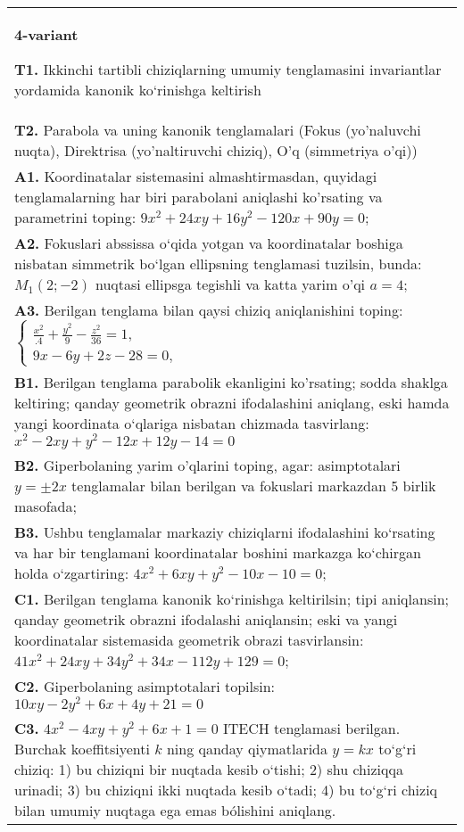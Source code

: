 \documentclass{article}
\begin{document}
\begin{tabular}{m{17cm}}
\textbf{4-variant}
\newline

\textbf{T1.} Ikkinchi tartibli chiziqlarning umumiy tenglamasini invariantlar yordamida kanonik ko‘rinishga keltirish \\
\textbf{T2.} Parabola va uning kanonik tenglamalari (Fokus (yo’naluvchi nuqta), Direktrisa (yo’naltiruvchi chiziq), O’q (simmetriya o’qi)) \\
\textbf{A1.} Koordinatalar sistemasini almashtirmasdan, quyidagi tenglamalarning har biri parabolani aniqlashi ko'rsating va parametrini toping: $9 x^2+24 x y+16 y^2-120 x+90 y=0$; \\
\textbf{A2.} Fokuslari abssissa o‘qida yotgan va koordinatalar boshiga nisbatan simmetrik bo‘lgan ellipsning tenglamasi tuzilsin, bunda: $M_1(2 ;-2)$ nuqtasi ellipsga tegishli va katta yarim o'qi $a=4$; \\
\textbf{A3.} Berilgan tenglama bilan qaysi chiziq aniqlanishini toping: $\left\{\begin{array}{l}\frac{x^2}{.4}+\frac{y^2}{9}-\frac{z^2}{36}=1, \\ 9 x-6 y+2 z-28=0,\end{array}\right.$ \\
\textbf{B1.} Berilgan tenglama parabolik ekanligini ko'rsating; sodda shaklga keltiring; qanday geometrik obrazni ifodalashini aniqlang, eski hamda yangi koordinata o‘qlariga nisbatan chizmada tasvirlang: $x^2-2 x y+y^2-12 x+12 y-14=0$ \\
\textbf{B2.} Giperbolaning yarim o'qlarini toping, agar: asimptotalari $y= \pm 2 x$ tenglamalar bilan berilgan va fokuslari markazdan 5 birlik masofada; \\
\textbf{B3.} Ushbu tenglamalar markaziy chiziqlarni ifodalashini ko‘rsating va har bir tenglamani koordinatalar boshini markazga ko‘chirgan holda o‘zgartiring: $4 x^2+6 x y+y^2-10 x-10=0$; \\
\textbf{C1.} Berilgan tenglama kanonik ko‘rinishga keltirilsin; tipi aniqlansin; qanday geometrik obrazni ifodalashi aniqlansin; eski va yangi koordinatalar sistemasida geometrik obrazi tasvirlansin: $41 x^2+24 x y+34 y^2+34 x-112 y+129=0$; \\
\textbf{C2.} Giperbolaning asimptotalari topilsin: $10 x y-2 y^2+6 x+4 y+21=0$ \\
\textbf{C3.} $4 x^2-4 x y+y^2+6 x+1=0$ ITECH tenglamasi berilgan. Burchak koeffitsiyenti $k$ ning qanday qiymatlarida $y=kx$ to‘g‘ri chiziq: 1) bu chiziqni bir nuqtada kesib o‘tishi; 2) shu chiziqqa urinadi; 3) bu chiziqni ikki nuqtada kesib o‘tadi; 4) bu to‘g‘ri chiziq bilan umumiy nuqtaga ega emas bólishini aniqlang. \\

\end{tabular}
\vspace{1cm}
\end{document}
